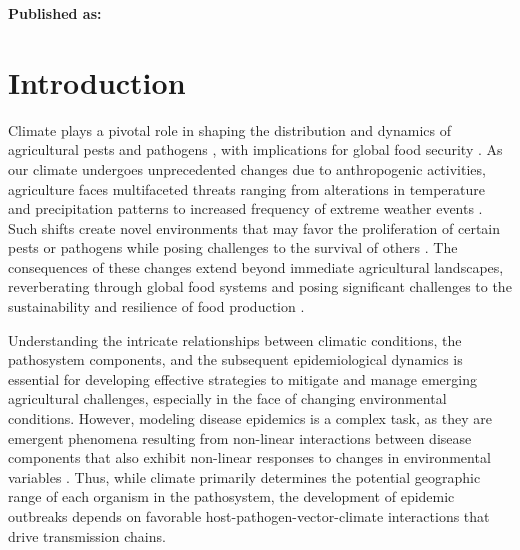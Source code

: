 




\textbf{Published as:}

\vspace{0.5cm}


\newpage
\section{Introduction}

Climate plays a pivotal role in shaping the distribution and dynamics of
agricultural pests and pathogens
\cite{Harvell2002,Lafferty2009,Bebber2013,Bebber2014,Delgado-Baquerizo2020},
with implications for global food security \cite{Fones2020, Ristaino}. As our
climate undergoes unprecedented changes due to anthropogenic activities,
agriculture faces multifaceted threats ranging from alterations in temperature
and precipitation patterns to increased frequency of extreme weather events
\cite{skendzic2021impact}. Such shifts create novel environments that may
favor the proliferation of certain pests or pathogens while posing challenges
to the survival of others \cite{Bebber2013, Dudney2021}. The consequences of
these changes extend beyond immediate agricultural landscapes, reverberating
through global food systems and posing significant challenges to the
sustainability and resilience of food production \cite{Ortiz-Bobea2021}.

Understanding the intricate relationships between climatic conditions, the
pathosystem components, and the subsequent epidemiological dynamics is
essential for developing effective strategies to mitigate and manage emerging
agricultural challenges, especially in the face of changing environmental
conditions. However, modeling disease epidemics is a complex task, as they
are emergent phenomena resulting from non-linear interactions between disease
components that also exhibit non-linear responses to changes in environmental
variables \cite{Scherm1994,garrett2011complexity,Jeger2019}.
Thus, while climate primarily determines the potential geographic range of each
organism in the pathosystem, the development of epidemic outbreaks depends on
favorable host-pathogen-vector-climate interactions that drive transmission
chains.

